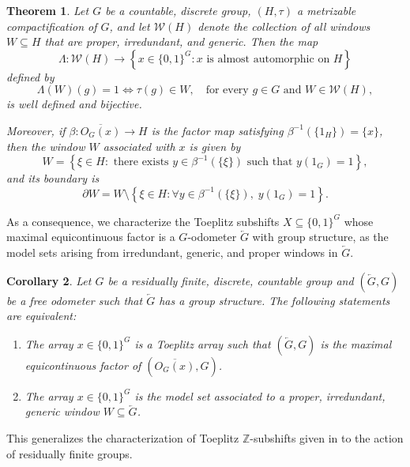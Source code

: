 \documentclass[titlepage,reqno,10pt]{amsart}
\newtheorem{theorem}{Theorem}[section]
\newtheorem{corollary}[theorem]{Corollary}
\theoremstyle{definition}
\begin{document}
\begin{theorem}\label{thm: chara almost automorphic (introduction)}
  Let $G$ be a countable, discrete group, $(H, \tau)$ a metrizable compactification of $G$, and let $\mathcal{W}(H)$ denote the collection of all windows $W \subseteq H$ that are proper, irredundant, and generic. Then the map
\[
\Lambda: \mathcal{W}(H) \to \left\{x \in \{0,1\}^G : x \text{ is almost automorphic on } H\right\}
\]
defined by
\[
\Lambda(W)(g) = 1 \iff \tau(g) \in W, \quad \text{for every } g \in G \text{ and } W \in \mathcal{W}(H),
\]
is well defined and bijective.

Moreover, if $\beta: \overline{O_G(x)} \to H$ is the factor map satisfying $\beta^{-1}(\{1_H\}) = \{x\}$, then the window $W$ associated with $x$ is given by
\[
W = \left\{ \xi \in H : \text{ there exists } y \in \beta^{-1}(\{\xi\}) \text{ such that } y(1_G) = 1 \right\},
\]
and its boundary is
\[
\partial W = W \setminus \left\{ \xi \in H : \forall y \in \beta^{-1}(\{\xi\}), \; y(1_G) = 1 \right\}.
\]
\end{theorem}

As a consequence, we characterize the Toeplitz subshifts \(X \subseteq \{0,1\}^G\) whose maximal equicontinuous factor is a $G$-odometer \(\overleftarrow{G}\) with group structure, as the model sets arising from irredundant, generic, and proper windows in \(\overleftarrow{G}\). 

\begin{corollary}\label{cor: chara Toeplitz model (introduction)}
    Let $G$ be a residually finite, discrete, countable group and $(\overleftarrow{G},G)$ be a free odometer such that $\overleftarrow{G}$ has a group structure. The following statements are equivalent:
\begin{enumerate}
\item The array $x\in\{0,1\}^G$ is a Toeplitz array such that $(\overleftarrow{G},G)$ is the maximal e\-qui\-con\-ti\-nuous factor of $(\overline{O_G(x)},G)$.


\item The array $x\in\{0,1\}^G$ is the model set associated to a proper, irredundant, generic window $W\subseteq \overleftarrow{G}$.
\end{enumerate}
\end{corollary}

This generalizes the characterization of Toeplitz \(\mathbb{Z}\)-subshifts given in \cite{BaJäLe16} to the action of residually finite groups. 
\medskip 
\end{document}
